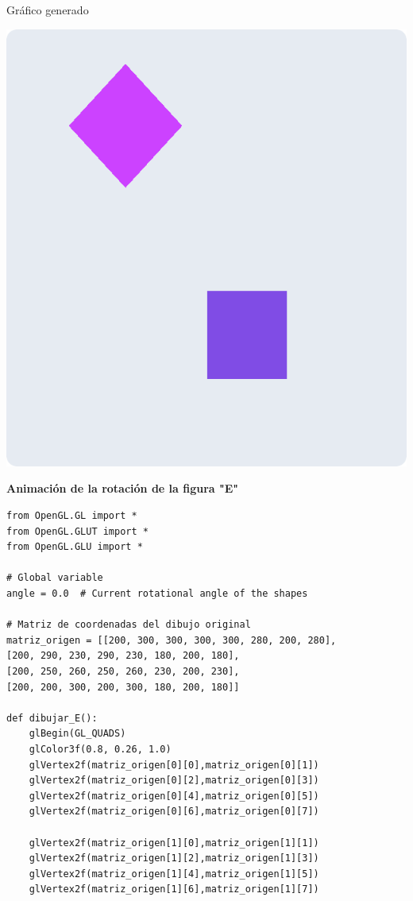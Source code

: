 \documentclass[a4paper]{article}
\begin{document}
Gráfico generado 
\begin{center}
\includegraphics[width=15cm]{./src/cuadrado.png}
\end{center}
\newpage
\Large{\textbf{Animación de la rotación de la figura "E"}}\\[-0.4cm]
\begin{center}
\begin{mycodeboxl}
\begin{lstlisting}
from OpenGL.GL import *
from OpenGL.GLUT import *
from OpenGL.GLU import *

# Global variable
angle = 0.0  # Current rotational angle of the shapes

# Matriz de coordenadas del dibujo original
matriz_origen = [[200, 300, 300, 300, 300, 280, 200, 280],
[200, 290, 230, 290, 230, 180, 200, 180],
[200, 250, 260, 250, 260, 230, 200, 230],
[200, 200, 300, 200, 300, 180, 200, 180]]

def dibujar_E():
    glBegin(GL_QUADS)
    glColor3f(0.8, 0.26, 1.0)
    glVertex2f(matriz_origen[0][0],matriz_origen[0][1])
    glVertex2f(matriz_origen[0][2],matriz_origen[0][3])
    glVertex2f(matriz_origen[0][4],matriz_origen[0][5])
    glVertex2f(matriz_origen[0][6],matriz_origen[0][7])

    glVertex2f(matriz_origen[1][0],matriz_origen[1][1])
    glVertex2f(matriz_origen[1][2],matriz_origen[1][3])
    glVertex2f(matriz_origen[1][4],matriz_origen[1][5])
    glVertex2f(matriz_origen[1][6],matriz_origen[1][7])
\end{lstlisting}
\end{mycodeboxl}
\end{center}
\newpage
\end{document}
